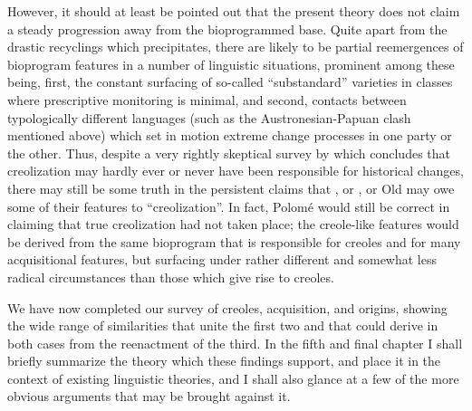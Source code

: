 However, it should at least be pointed out that the present theory does not claim a steady progression away from the bioprogrammed base. Quite apart from the drastic recyclings which  precipitates, there are likely to be partial reemergences of bioprogram features in a number of linguistic situations, prominent among these being, first, the constant surfacing of so-called ``substandard'' varieties in classes where prescriptive monitoring is minimal, and second, contacts between typologically different languages (such as the Austronesian-Papuan clash mentioned above) which set in motion extreme change processes in one party or the other. Thus, despite a very rightly skeptical survey by \citet{Polome1980} which concludes that creolization may hardly ever or never have been responsible for historical changes, there may still be some truth in the persistent claims that , or , or Old  may owe some of their features to ``creolization''. In fact, Polomé would still be correct in claiming that true creolization had not taken place; the creole-like features would be derived from the same bioprogram that is responsible for creoles and for many acquisitional features, but surfacing under rather different and somewhat less radical circumstances than those which give rise to creoles.

We have now completed our survey of creoles, acquisition, and origins, showing the wide range of similarities that unite the first two and that could derive in both cases from the reenactment of the third. In the fifth and final chapter I shall briefly summarize the theory which these findings support, and place it in the context of existing linguistic theories, and I shall also glance at a few of the more obvious arguments that may be brought against it.
